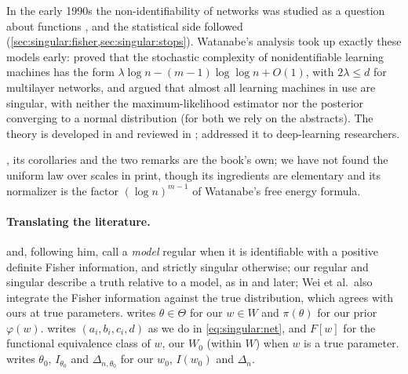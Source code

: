 \begin{refsection}
\notesandrefs
In the early 1990s the non-identifiability of networks was studied as a question about functions \parencite{Sussmann1992,ChenEtAl1993}, and the statistical side followed (\cref{sec:singular:fisher,sec:singular:stops}). Watanabe's analysis took up exactly these models early: \textcite{Watanabe2001a} proved that the stochastic complexity of nonidentifiable learning machines has the form $\lambda\log n-(m-1)\log\log n+O(1)$, with $2\lambda\le d$ for multilayer networks, and \textcite{Watanabe2007} argued that almost all learning machines in use are singular, with neither the maximum-likelihood estimator nor the posterior converging to a normal distribution (for both we rely on the abstracts). The theory is developed in \textcite{Watanabe2009,Watanabe2018} and reviewed in \textcite{Watanabe2024}; \textcite{WeiEtAl2023} addressed it to deep-learning researchers.

, its corollaries and the two remarks are the book's own; we have not found the uniform law over scales in print, though its ingredients are elementary and its normalizer is the factor $(\log n)^{m-1}$ of Watanabe's free energy formula.

\paragraph{Translating the literature.} \Textcite{Watanabe2009} and, following him, \textcite{WeiEtAl2023} call a \emph{model} regular when it is identifiable with a positive definite Fisher information, and strictly singular otherwise; our regular and singular describe a truth relative to a model, as in \textcite{Watanabe2010} and later; Wei et al.\ also integrate the Fisher information against the true distribution, which agrees with ours at true parameters. \Textcite{Watanabe2024} writes $\theta\in\Theta$ for our $w\in W$ and $\pi(\theta)$ for our prior $\varphi(w)$. \Textcite{FarrugiaRoberts2023a} writes $(a_i,b_i,c_i,d)$ as we do in \eqref{eq:singular:net}, and $F[w]$ for the functional equivalence class of $w$, our $W_0$ (within $W$) when $w$ is a true parameter. \Textcite{vanderVaart1998} writes $\theta_0$, $I_{\theta_0}$ and $\Delta_{n,\theta_0}$ for our $w_0$, $I(w_0)$ and $\Delta_n$.

\printchapterbib
\end{refsection}
